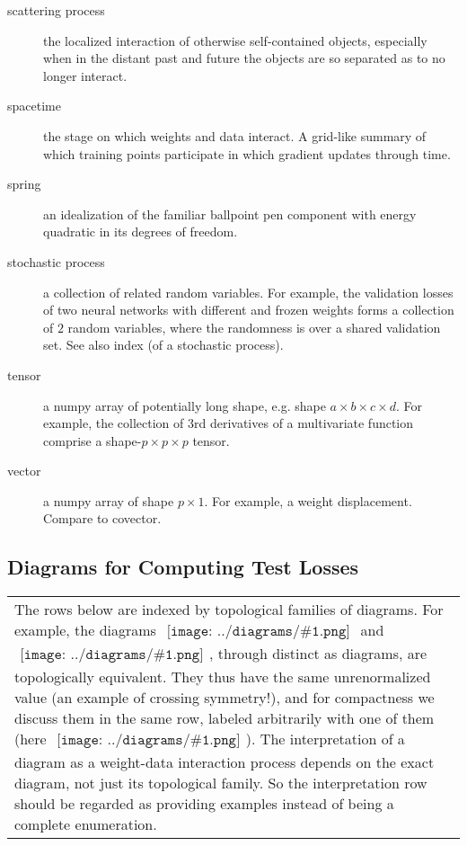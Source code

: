 \documentclass{article}
\newcommand{\sdia}[1]{\begin{gathered}\texttt{[image: ../diagrams/\#1.png]}\end{gathered}}
\begin{document}
\begin{description}
        \item[scattering process] the localized interaction of otherwise self-contained objects, especially when in the distant past and future the objects are so separated as to no longer interact.
        \item[spacetime] the stage on which weights and data interact.  A grid-like summary of which training points participate in which gradient updates through time. 
        \item[spring] an idealization of the familiar ballpoint pen component with energy quadratic in its degrees of freedom.
        \item[stochastic process] a collection of related random variables.  For example, the validation losses of two neural networks with different and frozen weights forms a collection of $2$ random variables, where the randomness is over a shared validation set.  See also index (of a stochastic process).
        \item[tensor] a numpy array of potentially long shape, e.g. shape $a\times b\times c\times d$.  For example, the collection of $3$rd derivatives of a multivariate function comprise a shape-$p\times p\times p$ tensor. 
        \item[vector] a numpy array of shape $p\times 1$.  For example, a weight displacement.  Compare to covector.
    \end{description}

    \clearpage
    \newpage

    \subsection{Diagrams for Computing Test Losses}

    \begin{tabular}{p{}}
        The rows below are indexed by topological families of diagrams.  For
        example, the diagrams $\sdia{(0-1-2)(01-12)}$ and
        $\sdia{(0-1-2)(02-12)}$, through distinct as diagrams, are
        topologically equivalent.  They thus have the same unrenormalized value
        (an example of crossing symmetry!), and for compactness we discuss them
        in the same row, labeled arbitrarily with one of them (here
        $\sdia{(0-1-2)(02-12)}$).  The interpretation of a diagram as a
        weight-data interaction process depends on the exact diagram, not just
        its topological family.  So the interpretation row should be regarded
        as providing examples instead of being a complete enumeration.
    \end{tabular}    
\end{document}
